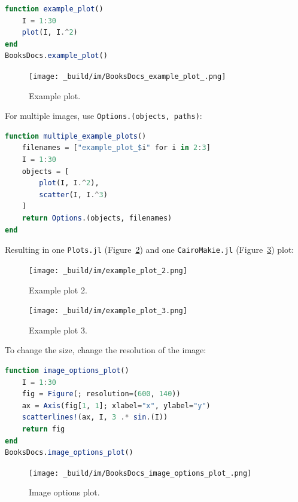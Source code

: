 \documentclass[
  notoc %
]{tufte-book}
\newcommand{\passthrough}[1]{#1}
\begin{document}
\begin{lstlisting}[language=Julia]
function example_plot()
    I = 1:30
    plot(I, I.^2)
end
BooksDocs.example_plot()
\end{lstlisting}

\begin{figure}
\hypertarget{fig:example_plot}{%
\centering
\texttt{[image: \_build/im/BooksDocs\_example\_plot\_.png]}
\caption{Example plot.}\label{fig:example_plot}
}
\end{figure}

For multiple images, use
\passthrough{\lstinline!Options.(objects, paths)!}:

\begin{lstlisting}[language=Julia]
function multiple_example_plots()
    filenames = ["example_plot_$i" for i in 2:3]
    I = 1:30
    objects = [
        plot(I, I.^2),
        scatter(I, I.^3)
    ]
    return Options.(objects, filenames)
end
\end{lstlisting}

Resulting in one \passthrough{\lstinline!Plots.jl!}
(Figure~\ref{fig:example_plot_2}) and one
\passthrough{\lstinline!CairoMakie.jl!}
(Figure~\ref{fig:example_plot_3}) plot:

\begin{figure}
\hypertarget{fig:example_plot_2}{%
\centering
\texttt{[image: \_build/im/example\_plot\_2.png]}
\caption{Example plot 2.}\label{fig:example_plot_2}
}
\end{figure}

\begin{figure}
\hypertarget{fig:example_plot_3}{%
\centering
\texttt{[image: \_build/im/example\_plot\_3.png]}
\caption{Example plot 3.}\label{fig:example_plot_3}
}
\end{figure}

To change the size, change the resolution of the image:

\begin{lstlisting}[language=Julia]
function image_options_plot()
    I = 1:30
    fig = Figure(; resolution=(600, 140))
    ax = Axis(fig[1, 1]; xlabel="x", ylabel="y")
    scatterlines!(ax, I, 3 .* sin.(I))
    return fig
end
BooksDocs.image_options_plot()
\end{lstlisting}

\begin{figure}
\hypertarget{fig:image_options_plot}{%
\centering
\texttt{[image: \_build/im/BooksDocs\_image\_options\_plot\_.png]}
\caption{Image options plot.}\label{fig:image_options_plot}
}
\end{figure}
\end{document}
